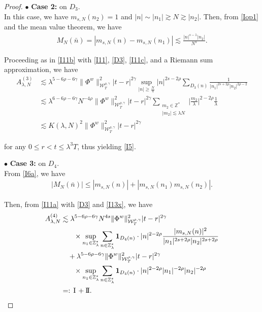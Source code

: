 \documentclass[letterpaper, 11pt,  reqno]{amsart}
\newcommand{\1}{\hspace{0.5mm}\text{I}\hspace{0.5mm}}
\newcommand{\II}{\text{I \hspace{-2.8mm} I} }
\newcommand{\noi}{\noindent}
\newcommand{\Z}{\mathbb{Z}}
\newcommand{\g}{\gamma}
\newcommand{\ld}{\lambda}
\newcommand{\les}{\lesssim}
\newcommand{\ges}{\gtrsim}
\newcommand{\ind}{\mathbf 1}
\newcommand{\W}{\mathcal{W}}
\numberwithin{equation}{section}
\numberwithin{theorem}{section}
\begin{document}
\begin{proof}
\medskip

\noi
$\bullet$ \textbf{Case 2:} on  $D_3$.\\
\indent
In this case, we have $m_{s, N}(n_2) = 1$
and $|n| \sim |n_1| \ges N \ges |n_2|$.
Then,  from \eqref{Iop1} and the mean value theorem, we have
\begin{align}
M_N(\bar n)
= |m_{s, N}(n)-m_{s, N}(n_1)|\les \frac{|n|^{s-1}|n_2|}{N^s}.
\label{I11c}
\end{align}



\noi
Proceeding as in \eqref{I11b} with  
\eqref{I11}, \eqref{D3},   \eqref{I11c}, 
and a Riemann sum approximation,  we have 
\begin{align*}
A_{\ld, N}^{(3)}
&  \les 
\ld^{5-6\rho - 6\g}
  \|\Phi^{w} \|^2_{\W^{\rho,\g}_T} |t-r|^{2\g}
\sup_{|n|\geq \frac N4}|n|^{2s-2\rho}
\sum_{D_3(n)} \frac{1}{|n_1|^{2s+2\rho}|n_2|^{2\rho-2}}\\
&  \les 
\ld^{6-6\rho - 6\g}N^{-4\rho}
  \|\Phi^{w} \|^2_{\W^{\rho,\g}_T} |t-r|^{2\g}
  \sum_{\substack{m_2 \in \Z^*\\ |m_2|\les \ld N}} 
 \Big|\frac {m_2}\ld \Big|^{2-2\rho}\frac 1\ld\\
 &\les 
K(\ld, N)^2
 \| \Phi^{w} \|^2_{\W_{T}^{\rho, \g}}  
|t-r|^{2\g}
 \end{align*}
 
 
 \noi
for any $0\leq r<t\leq \ld^3T$, 
thus yielding \eqref{I5}.








\medskip

\noi
$\bullet$ \textbf{Case 3:} on  $D_4$.\\
\indent
From \eqref{I6a}, we have
\begin{align}
|M_N(\bar n)|\le |m_{s, N} (n)| + | m_{s, N} (n_1) m_{s, N}(n_2)|.
\label{I13x}
\end{align}

\noi
Then, from \eqref{I11a} with \eqref{D3}  and \eqref{I13x}, we have 
\begin{align}
\begin{split}
A_{\ld, N}^{(4)}
& \les 
\ld^{5-6\rho -6\g}N^{4s }
\| \Phi^{w} \|^2_{\W_{T}^{\rho, \g}} 
|t-r|^{2\g} \\
& \hphantom{XX}
\times
\sup_{n_1 \in \Z_\ld^*} 
\sum_{n\in \Z_\ld^*} 
\ind_{D_4(n)}\cdot
|n|^{2-2\rho}
\frac{  |m_{s, N}(n)|^2}{|n_1|^{2s + 2\rho}|n_2|^{2s + 2\rho}}\\
& \quad + 
\ld^{5-6\rho -6\g}
\| \Phi^{w} \|^2_{\W_{T}^{\rho, \g}} 
|t-r|^{2\g} \\
& \hphantom{XX}
\times
\sup_{n_1 \in \Z_\ld^*} 
\sum_{n\in \Z_\ld^*} 
\ind_{D_4(n)}\cdot|n|^{2-2\rho}
|n_1|^{- 2\rho}|n_2|^{- 2\rho}\\
 & =: \1 + \II.
\end{split}
\label{I13a}
\end{align}










\end{proof}
\end{document}

